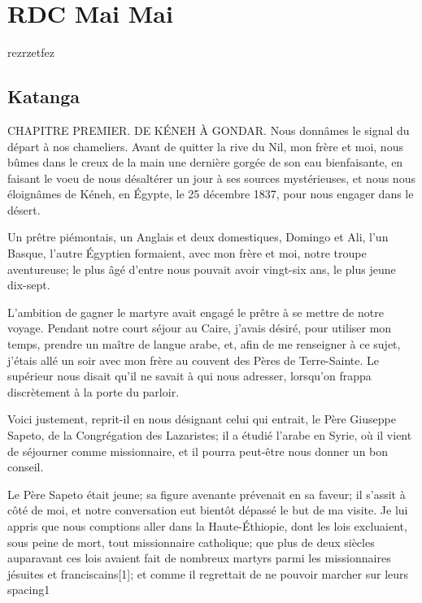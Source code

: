 \documentclass[12pt]{book}
\begin{document}
\part{RDC Mai Mai}%
rezrzetfez
\chapter{Katanga}%
CHAPITRE PREMIER.
DE KÉNEH À GONDAR.
Nous donnâmes le signal du départ à nos chameliers. Avant de quitter la
rive du Nil, mon frère et moi, nous bûmes dans le creux de la main une
dernière gorgée de son eau bienfaisante, en faisant le voeu de nous
désaltérer un jour à ses sources mystérieuses, et nous nous éloignâmes
de Kéneh, en Égypte, le 25 décembre 1837, pour nous engager dans le
désert.

Un prêtre piémontais, un Anglais et deux domestiques, Domingo et Ali,
l'un Basque, l'autre Égyptien formaient, avec mon frère et moi, notre
troupe aventureuse; le plus âgé d'entre nous pouvait avoir vingt-six
ans, le plus jeune dix-sept.

L'ambition de gagner le martyre avait engagé le prêtre à se mettre de notre voyage. Pendant notre court séjour au Caire, j'avais désiré, pour utiliser mon temps, prendre un maître de langue arabe, et, afin de me renseigner à ce sujet, j'étais allé un soir avec mon frère au couvent des Pères de Terre-Sainte. Le supérieur nous disait qu'il ne savait à qui nous adresser, lorsqu'on frappa discrètement à la porte du parloir.

Voici justement, reprit-il en nous désignant celui qui entrait, le Père Giuseppe Sapeto, de la Congrégation des Lazaristes; il a étudié l'arabe en Syrie, où il vient de séjourner comme missionnaire, et il pourra peut-être nous donner un bon conseil.

Le Père Sapeto était jeune; sa figure avenante prévenait en sa faveur; il s'assit à côté de moi, et notre conversation eut bientôt dépassé le but de ma visite. Je lui appris que nous comptions aller dans la Haute-Éthiopie, dont les lois excluaient, sous peine de mort, tout missionnaire catholique; que plus de deux siècles auparavant ces lois avaient fait de nombreux martyrs parmi les missionnaires jésuites et franciscains[1]; et comme il regrettait de ne pouvoir marcher sur leurs
{spacing}{1}%
\end{document}
